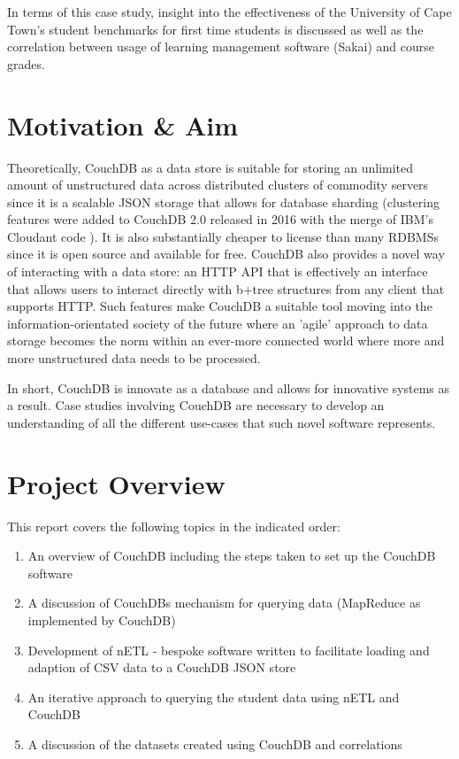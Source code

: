 In terms of this case study, insight into the effectiveness of the University of Cape Town's student benchmarks for first time students is discussed as well as the correlation between usage of learning management software (Sakai) and course grades.

\section{Motivation \& Aim}
Theoretically, CouchDB as a data store is suitable for storing an unlimited amount of unstructured data across distributed clusters of commodity servers since it is a scalable JSON storage that allows for database sharding (clustering features were added to CouchDB 2.0 released in 2016 with the merge of IBM's Cloudant code \cite{couchdb2.0}). It is also substantially cheaper to license than many RDBMSs since it is open source and available for free. CouchDB also provides a novel way of interacting with a data store: an HTTP API that is effectively an interface that allows users to interact directly with b+tree structures from any client that supports HTTP. Such features make CouchDB a suitable tool moving into the information-orientated society of the future where an 'agile' approach to data storage becomes the norm within an ever-more connected world where more and more unstructured data needs to be processed.

In short, CouchDB is innovate as a database and allows for innovative systems as a result. Case studies involving CouchDB are necessary to develop an understanding of all the different use-cases that such novel software represents.

\section{Project Overview}
This report covers the following topics in the indicated order:

\begin{enumerate}
    \item An overview of CouchDB including the steps taken to set up the CouchDB software
    \item A discussion of CouchDBs mechanism for querying data (MapReduce as implemented by CouchDB)
    \item Development of nETL - bespoke software written to facilitate loading and adaption of CSV data to a CouchDB JSON store
    \item An iterative approach to querying the student data using nETL and CouchDB
    \item A discussion of the datasets created using CouchDB and correlations
\end{enumerate}

